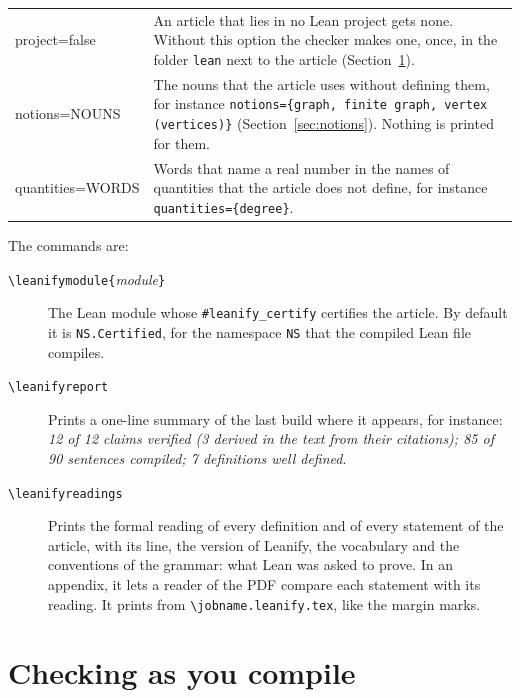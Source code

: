 \documentclass[11pt]{article}
\newcommand*\cs[1]{\texttt{\textbackslash#1}}
\begin{document}
\begin{tabularx}{\linewidth}{@{}>{\ttfamily}l X@{}}
project=false & An article that lies in no Lean project gets none. Without
  this option the checker makes one, once, in the folder \texttt{lean} next to
  the article (Section~\ref{sec:check}). \\
notions=NOUNS & The nouns that the article uses without defining them, for
  instance \texttt{notions=\{graph, finite graph, vertex (vertices)\}}
  (Section~\ref{sec:notions}). Nothing is printed for them. \\
quantities=WORDS & Words that name a real number in the names of quantities that
  the article does not define, for instance \texttt{quantities=\{degree\}}. \\
\bottomrule
\end{tabularx}

\medskip
\noindent The commands are:
\begin{description}
\item[\cs{leanifymodule}\texttt{\{}\textit{module}\texttt{\}}] The Lean module whose
  \texttt{\#leanify\_certify} certifies the article. By default it is
  \texttt{NS.Certified}, for the namespace \texttt{NS} that the compiled Lean file
  compiles.
\item[\cs{leanifyreport}] Prints a one-line summary of the last build where it
  appears, for instance: \emph{12 of 12 claims verified (3 derived in the text from
  their citations); 85 of 90 sentences compiled; 7 definitions well defined}.
\item[\cs{leanifyreadings}] Prints the formal reading of every definition and of
  every statement of the article, with its line, the version of Leanify, the
  vocabulary and the conventions of the grammar: what Lean was asked to prove.
  In an appendix, it lets a reader of the PDF compare each statement with its
  reading. It prints from \texttt{\cs{jobname}.leanify.tex}, like the margin
  marks.
\end{description}

\section{Checking as you compile}\label{sec:check}
\end{document}
